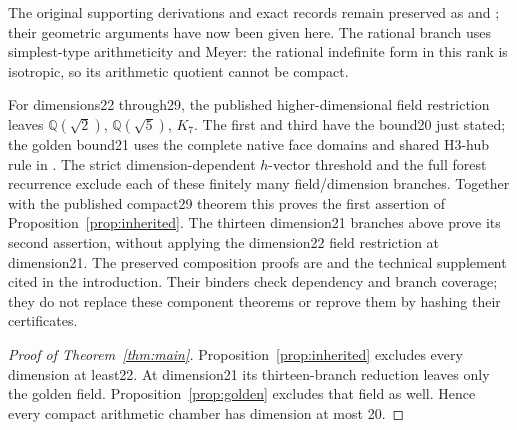 \documentclass[11pt]{article}
\newcommand{\Q}{\mathbb Q}
\begin{document}
The original supporting derivations and exact records remain preserved
as  and
;
their geometric arguments have now been given here.
The rational branch uses simplest-type arithmeticity and Meyer:
the rational indefinite form in this rank is isotropic, so its
arithmetic quotient cannot be compact.

For dimensions22 through29, the published higher-dimensional field
restriction leaves $\Q(\sqrt2)$, $\Q(\sqrt5)$, $K_7$. The first and third
have the bound20 just stated; the golden bound21 uses the complete
native face domains and shared H3-hub rule in\newline
{}.
The strict dimension-dependent $h$-vector threshold and the full forest
recurrence exclude each of these finitely many field/dimension branches.
Together with the published compact29 theorem this proves the first
assertion of Proposition~\ref{prop:inherited}. The thirteen dimension21
branches above prove its second assertion, without applying the
dimension22 field restriction at dimension21.
The preserved composition proofs are\newline
{} and the
technical supplement cited in the introduction. Their binders check
dependency and branch coverage; they do not replace these component
theorems or reprove them by hashing their certificates.

\begin{proof}[Proof of Theorem~\ref{thm:main}]
Proposition~\ref{prop:inherited} excludes every dimension at least22.
At dimension21 its thirteen-branch reduction leaves only the golden
field. Proposition~\ref{prop:golden} excludes that field as
well. Hence every compact arithmetic chamber has dimension at most 20.
\end{proof}
\end{document}
